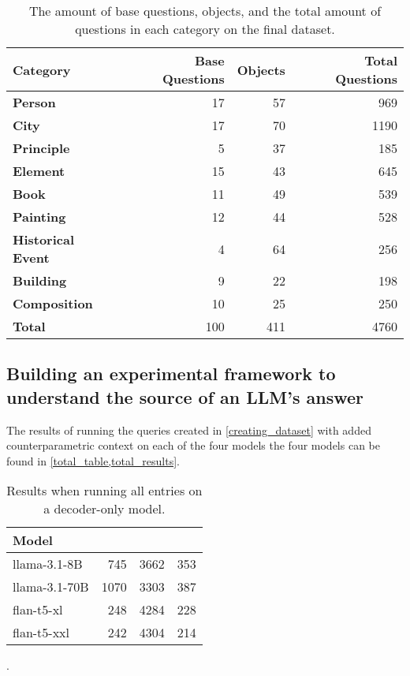 \begin{table}[ht]
	\centering
	\scriptsize
	\begin{tabular}{>{\bfseries}l r r r}
		\toprule
			\bfseries Category & \bfseries Base Questions & \bfseries Objects & \bfseries Total Questions \\
		\midrule
			Person           &  17 &  57 &  969 \\
			City             &  17 &  70 & 1190 \\
			Principle        &   5 &  37 &  185 \\
			Element          &  15 &  43 &  645 \\
			Book             &  11 &  49 &  539 \\
			Painting         &  12 &  44 &  528 \\
			Historical Event &   4 &  64 &  256 \\
			Building         &   9 &  22 &  198 \\
			Composition      &  10 &  25 &  250 \\
		\midrule
			Total            & 100 & 411 & 4760 \\
		\bottomrule
	\end{tabular}
	\caption{The amount of base questions, objects, and the total amount of questions in each category on the final dataset.}
	\label{category_amounts}
\end{table}


\subsection{Building an experimental framework to understand the source of an LLM's answer}
\label{parametric_vs_contextual}

The results of running the queries created in \cref{creating_dataset} with added counterparametric context on each of the four models the four models can be found in \cref{total_table,total_results}.

\begin{table}[htbp]
	\centering
	\footnotesize
	\begin{tabular}{l r r r}
		\toprule
			\bfseries Model & \Parametric{} & \Contextual{} & \Other{} \\
		\midrule
			\ttfamily llama-3.1-8B & 745 & 3662 & 353 \\
			\ttfamily llama-3.1-70B & 1070 & 3303 & 387 \\
		\midrule
			\ttfamily flan-t5-xl  & 248 & 4284 & 228 \\
			\ttfamily flan-t5-xxl & 242 & 4304 & 214 \\
		\bottomrule
	\end{tabular}
	\caption{Results when running all entries on a decoder-only model.}
	\label{total_table}.
\end{table}

